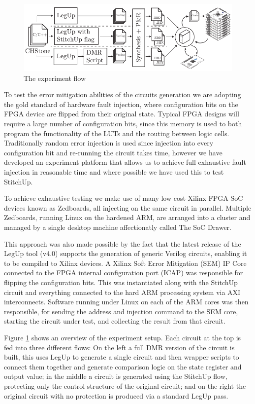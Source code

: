 \begin{figure}[t]
\centering
\includegraphics[width=6in]{./imgs/ExperimentFlow.pdf}
\caption{The experiment flow}
\label{fig:ExperimentFlow}
\end{figure}

To test the error mitigation abilities of the circuits generation we are adopting the
gold standard of hardware fault injection, where configuration bits on the 
FPGA device are flipped from their original state.
Typical FPGA designs will require a large number of configuration bits, since this
memory is used to both program the functionality of the LUTs and the routing between
logic cells.
Traditionally random error injection is used since injection into every configuration
bit and re-running the circuit takes time, however we have developed an experiment
platform that allows us to achieve full exhaustive fault injection in reasonable time
and where possible we have used this to test StitchUp.

To achieve exhaustive testing we make use of many low cost Xilinx FPGA SoC devices known as
Zedboards, all injecting on the same circuit in parallel.
Multiple Zedboards, running Linux on the hardened ARM, are arranged into a cluster and
managed by a single desktop machine affectionatly called The SoC Drawer.

This approach was also made possible by the fact that the latest release of the LegUp tool
(v4.0) supports the generation of generic Verilog circuits, enabling it to be compiled
to Xilinx devices.
A Xilinx Soft Error Mitigation (SEM) IP Core connected to the FPGA internal configuration
port (ICAP) was responsible for flipping the configuration bits.
This was instantiated along with the StitchUp circuit and everything connected to the hard
ARM processing system via AXI interconnects.  
Software running under Linux on each of the ARM cores was then responsible, for sending the
address and injection command to the SEM core, starting the circuit under test, and
collecting the result from that circuit. 

Figure \ref{fig:ExperimentFlow} shows an overview of the experiment setup.
Each circuit at the top is fed into three different flows:
On the  left a full DMR version of the circuit is built, this uses LegUp to generate a 
single circuit and then wrapper scripts to connect them together and
generate comparison logic on the state register and output value;
in the middle a circuit is generated using the StitchUp flow, protecting only the control
structure of the original circuit; and on the right the original circuit with no protection
is produced via a standard LegUp pass.


